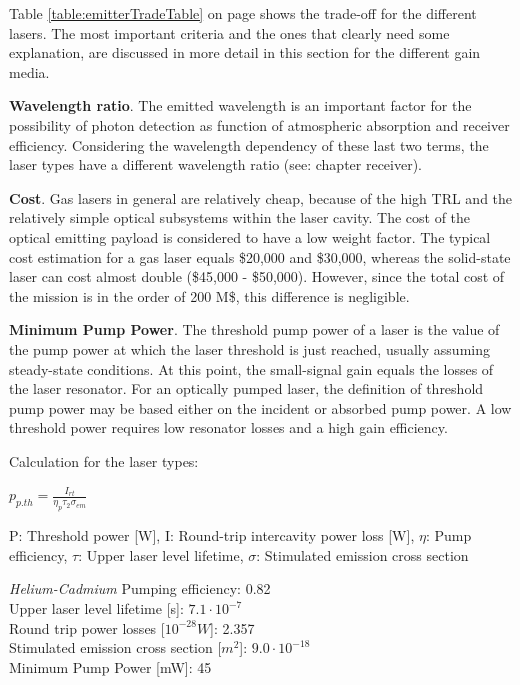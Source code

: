 Table \ref{table:emitterTradeTable} on page \pageref{table:emitterTradeTable} shows the trade-off for the different \acp{laser}. The most important  criteria and the ones that clearly need some explanation, are discussed in more detail in this section for the different gain media. 
	
\textbf{Wavelength ratio}. The emitted wavelength is an important factor for the possibility of photon detection as function of atmospheric absorption and receiver efficiency. Considering the wavelength dependency of these last two terms, the laser types have a different wavelength ratio (see: chapter receiver).

\textbf{Cost}. Gas \acs{laser}s in general are relatively cheap, because of the high \ac{TRL} and the relatively simple optical subsystems within the \acs{laser} cavity. The cost of the optical emitting payload is considered to have a low weight factor. The typical cost estimation for a gas \acs{laser} equals \$20,000 and \$30,000, whereas the solid-state \acs{laser} can cost almost double (\$45,000 - \$50,000). However, since the total cost of the mission is in the order of 200 M\$, this difference is negligible.
 
\textbf{Minimum Pump Power}. \cite{lasertech}The threshold pump power of a laser is the value of the pump power at which the laser threshold is just reached, usually assuming steady-state conditions. At this point, the small-signal gain equals the losses of the laser resonator. For an optically pumped laser, the definition of threshold pump power may be based either on the incident or absorbed pump power. A low threshold power requires low resonator losses and a high gain efficiency.

Calculation for the \acs{laser} types:

\begin{center}
$p_{p.th} = \frac{I_{rt}}{\eta_{p}\tau_{2}\sigma_{em}}$
\end{center}

P: Threshold power [W], I: Round-trip intercavity power loss [W], $\eta$: Pump efficiency, $\tau$: Upper laser level lifetime, $\sigma$: Stimulated emission cross section

\textit{Helium-Cadmium}
Pumping efficiency: 0.82\\
Upper \acs{laser} level lifetime [s]: $7.1\cdot10^{-7}$\\
Round trip power losses [$10^{-28} W$]: 2.357 \\
Stimulated emission cross section [$m^{2}$]: $9.0\cdot10^{-18}$\\
Minimum Pump Power [mW]: 45 

